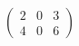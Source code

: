 \documentclass{article}%
\begin{document}
%
\pagestyle{empty}%
\LARGE%
$\begin{pmatrix} 2 & 0 & 3 \\ 4 & 0 & 6  \end{pmatrix}$%
\end{document}
